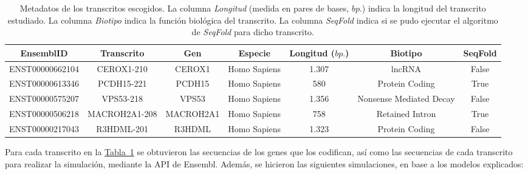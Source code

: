 \documentclass[a4paper,11pt,titlepage]{article}
\newcommand{\nr}[2][sección]{\hyperref[#2]{#1~\ref{#2}}}
\theoremstyle{definition}
\begin{document}
\begin{table}[H]
	\centering
    \begin{adjustbox}{width=\textwidth}
	\begin{tabular}{ccccccc}
	    \toprule
        EnsemblID & Transcrito & Gen & Especie & Longitud ($bp.$) & Biotipo & SeqFold \\
		\midrule
        ENST00000662104 & CEROX1-210 & CEROX1 & Homo Sapiens & 1.307 & lncRNA & False \\
        ENST00000613346 & PCDH15-221 & PCDH15 & Homo Sapiens & 580 & Protein Coding  & True \\
        ENST00000575207 & VPS53-218 & VPS53 & Homo Sapiens & 1.356 & Nonsense Mediated Decay & False \\
        ENST00000506218 & MACROH2A1-208 & MACROH2A1 & Homo Sapiens & 758 & Retained Intron & True \\
        ENST00000217043 & R3HDML-201 & R3HDML & Homo Sapiens & 1.323 & Protein Coding & False \\
		\bottomrule
	\end{tabular}
    \end{adjustbox}
	\small{\caption{Metadatos de los transcritos escogidos. La columna \textit{Longitud} (medida en pares de bases, $bp.$) indica la longitud del transcrito estudiado. La columna \textit{Biotipo} indica la función biológica del transcrito. La columna \textit{SeqFold} indica si se pudo ejecutar el algoritmo de \textit{SeqFold} para dicho transcrito.}\label{tab:transcripts}}\normalsize
\end{table}

Para cada transcrito en la \nr[Tabla]{tab:transcripts} se obtuvieron las secuencias de los genes que los codifican, así como las secuencias de cada transcrito para realizar la simulación, mediante la API de Ensembl. Además, se hicieron las siguientes simulaciones, en base a los modelos explicados: 
\end{document}
